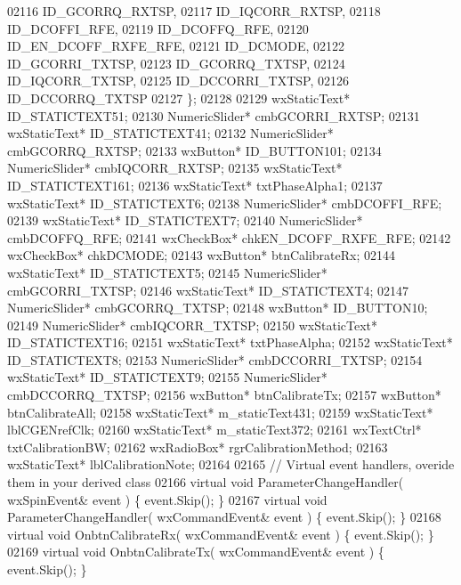\begin{DoxyCode}
02116             ID_GCORRQ_RXTSP,
02117             ID_IQCORR_RXTSP,
02118             ID_DCOFFI_RFE,
02119             ID_DCOFFQ_RFE,
02120             ID_EN_DCOFF_RXFE_RFE,
02121             ID_DCMODE,
02122             ID_GCORRI_TXTSP,
02123             ID_GCORRQ_TXTSP,
02124             ID_IQCORR_TXTSP,
02125             ID_DCCORRI_TXTSP,
02126             ID\_DCCORRQ\_TXTSP
02127         \};
02128         
02129         wxStaticText* ID_STATICTEXT51;
02130         NumericSlider* cmbGCORRI_RXTSP;
02131         wxStaticText* ID_STATICTEXT41;
02132         NumericSlider* cmbGCORRQ_RXTSP;
02133         wxButton* ID_BUTTON101;
02134         NumericSlider* cmbIQCORR_RXTSP;
02135         wxStaticText* ID_STATICTEXT161;
02136         wxStaticText* txtPhaseAlpha1;
02137         wxStaticText* ID_STATICTEXT6;
02138         NumericSlider* cmbDCOFFI_RFE;
02139         wxStaticText* ID_STATICTEXT7;
02140         NumericSlider* cmbDCOFFQ_RFE;
02141         wxCheckBox* chkEN_DCOFF_RXFE_RFE;
02142         wxCheckBox* chkDCMODE;
02143         wxButton* btnCalibrateRx;
02144         wxStaticText* ID_STATICTEXT5;
02145         NumericSlider* cmbGCORRI_TXTSP;
02146         wxStaticText* ID_STATICTEXT4;
02147         NumericSlider* cmbGCORRQ_TXTSP;
02148         wxButton* ID_BUTTON10;
02149         NumericSlider* cmbIQCORR_TXTSP;
02150         wxStaticText* ID_STATICTEXT16;
02151         wxStaticText* txtPhaseAlpha;
02152         wxStaticText* ID_STATICTEXT8;
02153         NumericSlider* cmbDCCORRI_TXTSP;
02154         wxStaticText* ID_STATICTEXT9;
02155         NumericSlider* cmbDCCORRQ_TXTSP;
02156         wxButton* btnCalibrateTx;
02157         wxButton* btnCalibrateAll;
02158         wxStaticText* m_staticText431;
02159         wxStaticText* lblCGENrefClk;
02160         wxStaticText* m_staticText372;
02161         wxTextCtrl* txtCalibrationBW;
02162         wxRadioBox* rgrCalibrationMethod;
02163         wxStaticText* lblCalibrationNote;
02164         
02165         \textcolor{comment}{// Virtual event handlers, overide them in your derived class}
02166         \textcolor{keyword}{virtual} \textcolor{keywordtype}{void} ParameterChangeHandler( wxSpinEvent& event ) \{ \textcolor{keyword}{event}.Skip(); \}
02167         \textcolor{keyword}{virtual} \textcolor{keywordtype}{void} ParameterChangeHandler( wxCommandEvent& event ) \{ \textcolor{keyword}{event}.Skip(); \}
02168         \textcolor{keyword}{virtual} \textcolor{keywordtype}{void} OnbtnCalibrateRx( wxCommandEvent& event ) \{ \textcolor{keyword}{event}.Skip(); \}
02169         \textcolor{keyword}{virtual} \textcolor{keywordtype}{void} OnbtnCalibrateTx( wxCommandEvent& event ) \{ \textcolor{keyword}{event}.Skip(); \}

\end{DoxyCode}
